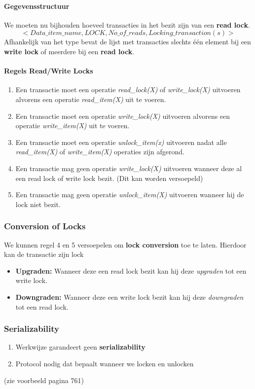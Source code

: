\paragraph{Gegevensstructuur}
We moeten nu bijhouden hoeveel transacties in het bezit zijn van een \textbf{read lock}.
\[<Data\_item\_name, LOCK, No\_of\_reads, Locking\_transaction(s)>\]
Afhankelijk van het type bevat de lijst met transacties slechts \'e\'en element bij een \textbf{write lock} of meerdere bij een \textbf{read lock}.

\paragraph{Regels Read/Write Locks}
\begin{enumerate}
	\item Een transactie moet een operatie \textit{read\_lock(X)} of \textit{write\_lock(X)} uitvoeren alvorens een operatie \textit{read\_item(X)} uit te voeren.
	\item Een transactie moet een operatie \textit{write\_lock(X)} uitvoeren alvorens een operatie \textit{write\_item(X)} uit te voeren.
	\item Een transactie moet een operatie \textit{unlock\_item(x)} uitvoeren nadat alle \textit{read\_item(X)} of \textit{write\_item(X)} operaties zijn afgerond.
	\item Een transactie mag geen operatie \textit{write\_lock(X)} uitvoeren wanneer deze al een read lock of write lock bezit. (Dit kan worden versoepeld)
	\item Een transactie mag geen operatie \textit{unlock\_item(X)} uitvoeren wanneer hij de lock niet bezit.
\end{enumerate}

\subsubsection{Conversion of Locks}
We kunnen regel 4 en 5 versoepelen om \textbf{lock conversion} toe te laten. Hierdoor kan de transactie zijn lock
\begin{itemize}
	\item \textbf{Upgraden:} Wanneer deze een read lock bezit kan hij deze \textit{upgraden} tot een write lock.
	\item \textbf{Downgraden:} Wanneer deze een write lock bezit kan hij deze \textit{downgraden} tot een read lock.
\end{itemize}

\subsubsection{Serializability}
\begin{enumerate}
	\item Werkwijze garandeert geen \textbf{serializability}
	\item Protocol nodig dat bepaalt wanneer we locken en unlocken
\end{enumerate}
(zie voorbeeld pagina 761)


